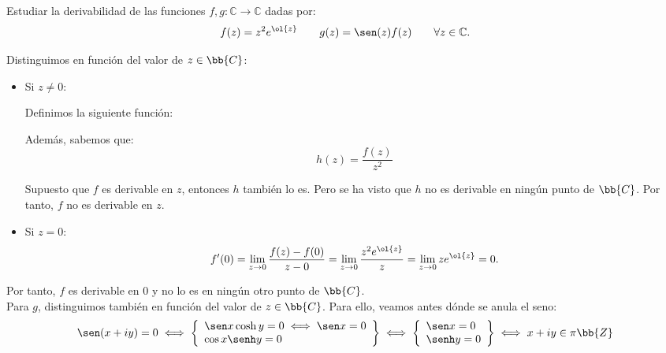 \documentclass[12pt]{article}
\begin{document}
    \begin{ejercicio}[3 puntos]
        Estudiar la derivabilidad de las funciones $f,g : \mathbb{C} \to \mathbb{C}$ dadas por:
        \[
            f(z) = z^2 e^{\ol{z}}
            \qquad g(z) = \sen(z) f(z) \qquad \forall z \in \mathbb{C}.
        \]

        Distinguimos en función del valor de $z\in \bb{C}$:
        \begin{itemize}
            \item Si $z\neq 0$:
            
            Definimos la siguiente función:
            
            Además, sabemos que:
            \begin{equation*}
                h(z) = \dfrac{f(z)}{z^2}
            \end{equation*}

            Supuesto que $f$ es derivable en $z$, entonces $h$ también lo es. Pero se ha visto que $h$ no es derivable en ningún punto de $\bb{C}$. Por tanto, $f$ no es derivable en $z$.

            \item Si $z=0$:
            \begin{equation*}
                f'(0) = \lim_{z\to 0} \dfrac{f(z)-f(0)}{z-0} = \lim_{z\to 0} \dfrac{z^2 e^{\ol{z}}}{z} = \lim_{z\to 0} z e^{\ol{z}} = 0.
            \end{equation*}
        \end{itemize}

        Por tanto, $f$ es derivable en $0$ y no lo es en ningún otro punto de $\bb{C}$.\\

        Para $g$, distinguimos también en función del valor de $z\in \bb{C}$. Para ello, veamos antes dónde se anula el seno:
        \begin{equation*}
            \sen(x+iy)=0\iff \left\{
                \begin{array}{l}
                    \sen x \cosh y = 0\iff \sen x =0\\
                    \cos x \senh y = 0
                \end{array}
            \right\}\iff
            \left\{
                \begin{array}{l}
                    \sen x =0\\
                    \senh y = 0
                \end{array}
            \right\}\iff x+iy\in \pi\bb{Z}
        \end{equation*}


\end{ejercicio}
\end{document}
